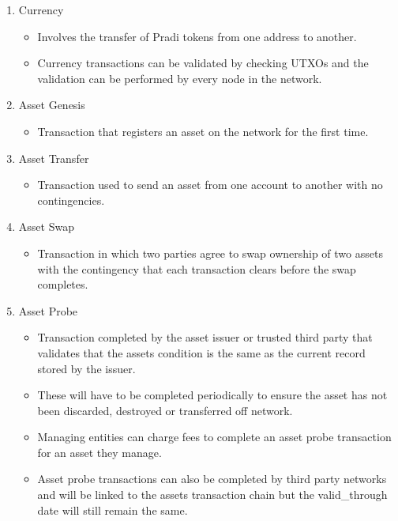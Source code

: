 \documentclass[12pt]{article}
\begin{document}
\begin{enumerate}
	\item Currency
		\begin{itemize}
			\item{Involves the transfer of Pradi tokens from one address to another.}
			\item{Currency transactions can be validated by checking UTXOs and the
				validation can be performed by every node in the network.}
		\end{itemize}
	\item Asset Genesis
		\begin{itemize}
			\item{Transaction that registers an asset on the network for the first time.}
		\end{itemize}
	\item Asset Transfer
		\begin{itemize}
			\item{Transaction used to send an asset from one account to another
				with no contingencies.}
		\end{itemize}
	\item Asset Swap
		\begin{itemize}
			\item{Transaction in which two parties agree to swap 
				ownership of two assets with the contingency that 
				each transaction clears before the swap completes.}
		\end{itemize}
	\item Asset Probe
		\begin{itemize}
			\item{Transaction completed by the asset issuer or 
				trusted third party that validates that the assets condition 
				is the same as the current record stored by the issuer.}
			\item{These will have to be 
				completed periodically to ensure the asset has not been 
				discarded, destroyed or transferred off network.}
			\item{Managing 
				entities can charge fees to complete an asset probe transaction 
				for an asset they manage.}
			\item{Asset probe transactions can also 
				be completed by third party networks and will be linked to 
				the assets transaction chain but the valid\_through date 
				will still remain the same.}
		\end{itemize}
\end{enumerate}

\end{document}
